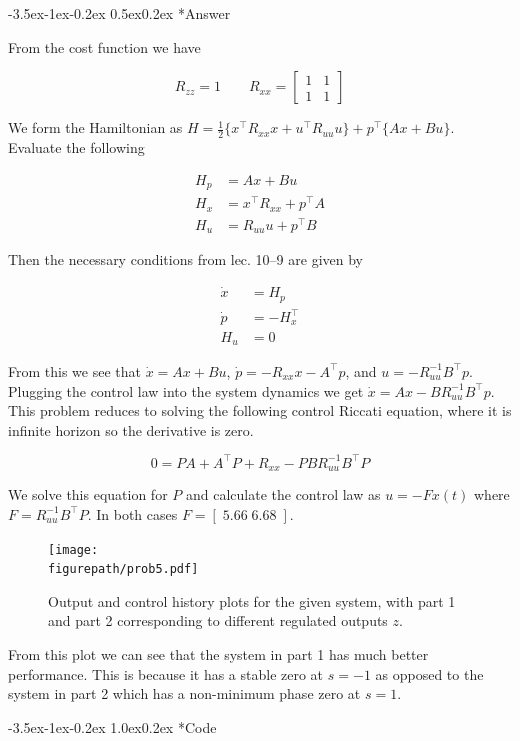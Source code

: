 \documentclass[11pt,letterpaper,onecolumn,notitlepage]{article}
\makeatletter
\newcommand{\figurepath}{../fig/hw3}
\newcommand{\codepath}{../include/code/hw3}
\renewcommand\section{\@startsection{section}{1}{\z@}%
{-3.5ex\@plus-1ex\@minus-0.2ex}%
{1.0ex\@plus0.2ex}%
{\fontsize{12pt}{12pt}\selectfont\bfseries\sffamily}}
\renewcommand\subsection{\@startsection{subsection}{1}{\z@}%
{-3.5ex\@plus-1ex\@minus-0.2ex}%
{0.5ex\@plus0.2ex}%
{\fontsize{10pt}{10pt}\selectfont\bfseries\sffamily}}
\makeatother
\begin{document}
  \subsection*{Answer}

  From the cost function we have

  \begin{equation*}
    R_{zz}=1
    \qquad
    R_{xx}=
    \begin{bmatrix}
      1 & 1 \\
      1 & 1
    \end{bmatrix}
  \end{equation*}

  We form the Hamiltonian as $H=\frac{1}{2}\{x^{\top}R_{xx}x+u^{\top}R_{uu}u\}+p^{\top}\{Ax+Bu\}$.
  Evaluate the following

  \begin{align*}
    H_{p} &= Ax+Bu \\
    H_{x} &= x^{\top}R_{xx}+p^{\top}A \\
    H_{u} &= R_{uu}u+p^{\top}B
  \end{align*}

  Then the necessary conditions from lec. 10--9 are given by

  \begin{align*}
    \dot{x} &= H_{p} \\
    \dot{p} &= -H_{x}^{\top} \\
    H_{u}   &= 0
  \end{align*}

  From this we see that $\dot{x}=Ax+Bu$, $\dot{p}=-R_{xx}x-A^{\top}p$, and $u=-R_{uu}^{-1}B^{\top}p$.
  Plugging the control law into the system dynamics we get $\dot{x}=Ax-BR_{uu}^{-1}B^{\top}p$.
  This problem reduces to solving the following control Riccati equation, where it is infinite horizon so the derivative is zero.

  \begin{equation*}
    0=PA+A^{\top}P+R_{xx}-PBR_{uu}^{-1}B^{\top}P
  \end{equation*}

  We solve this equation for $P$ and calculate the control law as $u=-Fx(t)$ where $F=R_{uu}^{-1}B^{\top}P$.
  In both cases $F=[\;5.66\;6.68\;]$.

  \begin{figure}[H]
    \centering
    \texttt{[image: \\figurepath/prob5.pdf]}
    \caption{Output and control history plots for the given system, with part 1 and part 2 corresponding to different regulated outputs $z$.\label{fig:prob5}}
  \end{figure}

  From this plot we can see that the system in part 1 has much better performance.
  This is because it has a stable zero at $s=-1$ as opposed to the system in part 2 which has a non-minimum phase zero at $s=1$.

  \clearpage
  \section*{Code}

  
  
  
\end{document}
